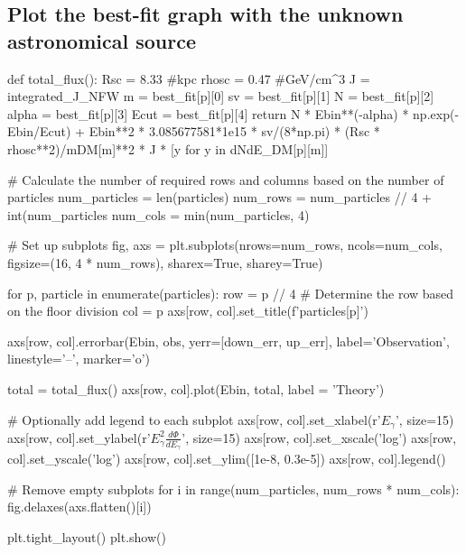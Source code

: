 \documentclass[10pt, oneside]{book}
\numberwithin{equation}{chapter}
\begin{document}
\subsection{Plot the best-fit graph with the unknown astronomical source}
\begin{python}
def total_flux():
    Rsc = 8.33 #kpc
    rhosc = 0.47 #GeV/cm^3
    J = integrated_J_NFW
    m = best_fit[p][0]
    sv = best_fit[p][1]
    N = best_fit[p][2]
    alpha = best_fit[p][3]
    Ecut = best_fit[p][4]
    return N * Ebin**(-alpha) * np.exp(-Ebin/Ecut) + Ebin**2 * 3.085677581*1e15 * sv/(8*np.pi) * (Rsc * rhosc**2)/mDM[m]**2 * J * [y for y in dNdE_DM[p][m]]


# Calculate the number of required rows and columns based on the number of particles
num_particles = len(particles)
num_rows = num_particles // 4 + int(num_particles %
num_cols = min(num_particles, 4)

# Set up subplots
fig, axs = plt.subplots(nrows=num_rows, ncols=num_cols, figsize=(16, 4 * num_rows), sharex=True, sharey=True)

for p, particle in enumerate(particles):
    row = p // 4  # Determine the row based on the floor division
    col = p %
    axs[row, col].set_title(f'{particles[p]}')

    axs[row, col].errorbar(Ebin, obs, yerr=[down_err, up_err], label='Observation', linestyle='--', marker='o')

    total = total_flux()
    axs[row, col].plot(Ebin, total, label = 'Theory')

    # Optionally add legend to each subplot
    axs[row, col].set_xlabel(r'$E_\gamma$', size=15)
    axs[row, col].set_ylabel(r'$E_\gamma^2\frac{d\Phi}{dE_\gamma}$', size=15)
    axs[row, col].set_xscale('log')
    axs[row, col].set_yscale('log')
    axs[row, col].set_ylim([1e-8, 0.3e-5])
    axs[row, col].legend()

# Remove empty subplots
for i in range(num_particles, num_rows * num_cols):
    fig.delaxes(axs.flatten()[i])

plt.tight_layout()
plt.show()
\end{python}
\end{document}
